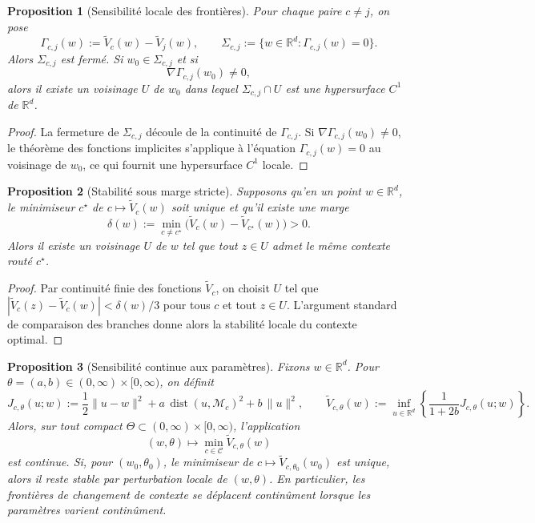 \documentclass[11pt,a4paper]{article}
\newtheorem{proposition}{Proposition}[section]
\DeclareMathOperator{\dist}{dist}
\newcommand{\R}{\mathbb R}
\newcommand{\Mcal}{\mathcal M}
\newcommand{\Ccal}{\mathcal C}
\begin{document}
\begin{proposition}[Sensibilité locale des frontières]
Pour chaque paire \(c\neq j\), on pose
\[
\Gamma_{c,j}(w):=\widetilde V_c(w)-\widetilde V_j(w),
\qquad
\Sigma_{c,j}:=\{w\in\R^d:\Gamma_{c,j}(w)=0\}.
\]
Alors \(\Sigma_{c,j}\) est fermé. Si \(w_0\in\Sigma_{c,j}\) et si
\[
\nabla \Gamma_{c,j}(w_0)\neq 0,
\]
alors il existe un voisinage \(U\) de \(w_0\) dans lequel \(\Sigma_{c,j}\cap U\) est une hypersurface \(C^1\) de \(\R^d\).
\end{proposition}

\begin{proof}
La fermeture de \(\Sigma_{c,j}\) découle de la continuité de \(\Gamma_{c,j}\). Si \(\nabla \Gamma_{c,j}(w_0)\neq 0\), le théorème des fonctions implicites s'applique à l'équation \(\Gamma_{c,j}(w)=0\) au voisinage de \(w_0\), ce qui fournit une hypersurface \(C^1\) locale.
\end{proof}

\begin{proposition}[Stabilité sous marge stricte]
Supposons qu'en un point \(w\in\R^d\), le minimiseur \(c^\star\) de \(c\mapsto \widetilde V_c(w)\) soit unique et qu'il existe une marge
\[
\delta(w):=\min_{c\neq c^\star}\bigl(\widetilde V_c(w)-\widetilde V_{c^\star}(w)\bigr)>0.
\]
Alors il existe un voisinage \(U\) de \(w\) tel que tout \(z\in U\) admet le même contexte routé \(c^\star\).
\end{proposition}

\begin{proof}
Par continuité finie des fonctions \(\widetilde V_c\), on choisit \(U\) tel que \(|\widetilde V_c(z)-\widetilde V_c(w)|<\delta(w)/3\) pour tous \(c\) et tout \(z\in U\). L'argument standard de comparaison des branches donne alors la stabilité locale du contexte optimal.
\end{proof}

\begin{proposition}[Sensibilité continue aux paramètres]
Fixons \(w\in\R^d\). Pour \(\theta=(a,b)\in(0,\infty)\times[0,\infty)\), on définit
\[
J_{c,\theta}(u;w)
:=
\frac12\|u-w\|^2+a\,\dist(u,\Mcal_c)^2+b\,\|u\|^2,
\qquad
\widetilde V_{c,\theta}(w)
:=
\inf_{u\in\R^d}
\left\{
\frac{1}{1+2b}J_{c,\theta}(u;w)
\right\}.
\]
Alors, sur tout compact \(\Theta\subset(0,\infty)\times[0,\infty)\), l'application
\[
(w,\theta)\longmapsto \min_{c\in\Ccal}\widetilde V_{c,\theta}(w)
\]
est continue. Si, pour \((w_0,\theta_0)\), le minimiseur de \(c\mapsto \widetilde V_{c,\theta_0}(w_0)\) est unique, alors il reste stable par perturbation locale de \((w,\theta)\). En particulier, les frontières de changement de contexte se déplacent continûment lorsque les paramètres varient continûment.
\end{proposition}
\end{document}
